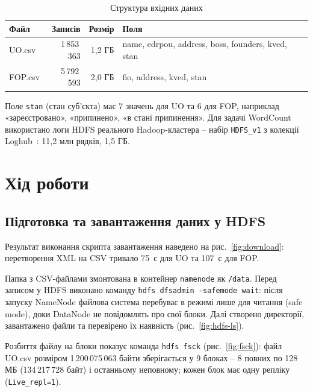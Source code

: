 \documentclass{iasa-lab}
\begin{document}
\begin{table}[H]
  \caption{Структура вхідних даних}\label{tab:data}
  \begin{tabularx}{\textwidth}{|l|r|r|Y|}
    \hline
    Файл & Записів & Розмір & Поля \\
    \hline
    UO.csv & 1\,853\,363 & 1,2 ГБ & name, edrpou, address, boss, founders, kved, stan \\
    FOP.csv & 5\,792\,593 & 2,0 ГБ & fio, address, kved, stan \\
    \hline
  \end{tabularx}
\end{table}

Поле \texttt{stan} (стан суб'єкта) має 7 значень для UO та 6 для FOP, наприклад «зареєстровано», «припинено», «в стані припинення». Для задачі WordCount використано логи HDFS реального Hadoop-кластера -- набір \texttt{HDFS\_v1} з колекції Loghub~\cite{loghub}: 11,2 млн рядків, 1,5 ГБ.

\section{Хід роботи}

\subsection{Підготовка та завантаження даних у HDFS}

Результат виконання скрипта завантаження наведено на рис.~\ref{fig:download}: перетворення XML на CSV тривало 75~с для UO та 107~с для FOP.


Папка з CSV-файлами змонтована в контейнер \texttt{namenode} як \texttt{/data}. Перед записом у HDFS виконано команду \texttt{hdfs dfsadmin -safemode wait}: після запуску NameNode файлова система перебуває в режимі лише для читання (safe mode), доки DataNode не повідомлять про свої блоки. Далі створено директорії, завантажено файли та перевірено їх наявність (рис.~\ref{fig:hdfs-ls}).


Розбиття файлу на блоки показує команда \texttt{hdfs fsck} (рис.~\ref{fig:fsck}): файл UO.csv розміром 1\,200\,075\,063 байти зберігається у 9 блоках -- 8 повних по 128 МБ (134\,217\,728 байт) і останньому неповному; кожен блок має одну репліку (\texttt{Live\_repl=1}).
\end{document}
